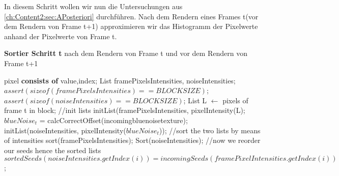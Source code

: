 In diesem Schritt wollen wir nun die Untersuchungen aus 
\ref{ch:Content2:sec:APosteriori} durchführen. Nach dem Rendern eines
Frames t(vor dem Rendern von Frame t+1) approximieren wir das Histogramm
der Pixelwerte anhand der Pixelwerte von Frame t.
\cite{hal02158423}
\begin{algorithm}[H]
    \caption{\textbf{Sortier Schritt t} nach dem Rendern von Frame t
    und vor dem Rendern von Frame t+1}
    \begin{algorithmic}[1]
        \STATE pixel \textbf{consists of} value,index;
        \STATE List framePixelsIntensities, noiseIntensities;
        \STATE $assert(sizeof(framePixelsIntensities)==BLOCKSIZE)$;
        \STATE $assert(sizeof(noiseIntensities)==BLOCKSIZE)$;
        \STATE List L $\leftarrow$ pixels of frame t in block;
        \STATE \hfill
        \STATE //init lists
        \STATE initList(framePixelsIntensities, pixelIntensity(L);
        \STATE $blueNoise_{t}$ = calcCorrectOffset(incomingbluenoisetexture);
        \STATE initList(noiseIntensities, pixelIntensity($blueNoise_{t}$));
        \STATE \hfill
        \STATE //sort the two lists by means of intensities
        \STATE sort(framePixelsIntensities);
        \STATE Sort(noiseIntensities);
        \STATE \hfill
        \STATE //now we reorder our seeds hence the sorted lists
        \STATE $sortedSeeds(noiseIntensities.getIndex(i)) = incomingSeeds(framePixelIntensities.getIndex(i))$;
        \ENDFOR
    \end{algorithmic}
    \label{alg:Sortier}
\end{algorithm}